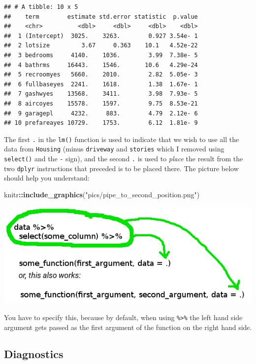 \documentclass[]{gitbook}
\newenvironment{Shaded}{\begin{snugshade}}{\end{snugshade}}
\newcommand{\KeywordTok}[1]{\textcolor[rgb]{0.13,0.29,0.53}{\textbf{#1}}}
\newcommand{\NormalTok}[1]{#1}
\newcommand{\OperatorTok}[1]{\textcolor[rgb]{0.81,0.36,0.00}{\textbf{#1}}}
\newcommand{\StringTok}[1]{\textcolor[rgb]{0.31,0.60,0.02}{#1}}
\theoremstyle{definition}
\theoremstyle{definition}
\theoremstyle{definition}
\theoremstyle{remark}
\begin{document}
\begin{verbatim}
## # A tibble: 10 x 5
##    term        estimate std.error statistic  p.value
##    <chr>          <dbl>     <dbl>     <dbl>    <dbl>
##  1 (Intercept)  3025.    3263.        0.927 3.54e- 1
##  2 lotsize         3.67     0.363    10.1   4.52e-22
##  3 bedrooms     4140.    1036.        3.99  7.38e- 5
##  4 bathrms     16443.    1546.       10.6   4.29e-24
##  5 recroomyes   5660.    2010.        2.82  5.05e- 3
##  6 fullbaseyes  2241.    1618.        1.38  1.67e- 1
##  7 gashwyes    13568.    3411.        3.98  7.93e- 5
##  8 aircoyes    15578.    1597.        9.75  8.53e-21
##  9 garagepl     4232.     883.        4.79  2.12e- 6
## 10 prefareayes 10729.    1753.        6.12  1.81e- 9
\end{verbatim}

The first \texttt{.} in the \texttt{lm()} function is used to indicate
that we wish to use all the data from \texttt{Housing} (minus
\texttt{driveway} and \texttt{stories} which I removed using
\texttt{select()} and the \texttt{-} sign), and the second \texttt{.} is
used to \emph{place} the result from the two \texttt{dplyr} instructions
that preceded is to be placed there. The picture below should help you
understand:

\begin{Shaded}
\begin{Highlighting}[]
\NormalTok{knitr}\OperatorTok{::}\KeywordTok{include_graphics}\NormalTok{(}\StringTok{"pics/pipe_to_second_position.png"}\NormalTok{)}
\end{Highlighting}
\end{Shaded}

\includegraphics[width=8in]{pics/pipe_to_second_position}

You have to specify this, because by default, when using
\texttt{\%\textgreater{}\%} the left hand side argument gets passed as
the first argument of the function on the right hand side.

\hypertarget{diagnostics}{%
\subsection{Diagnostics}\label{diagnostics}}
\end{document}
